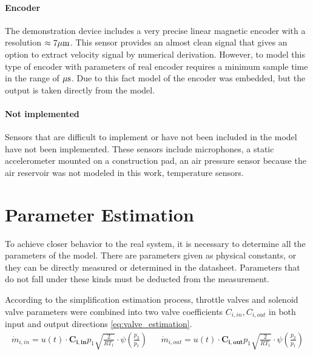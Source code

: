 \paragraph{Encoder}
The demonstration device includes a very precise linear magnetic encoder
with a resolution $\approx 7 \rm \mu m$. This sensor provides an almost
clean signal that gives an option to extract velocity signal by numerical
derivation.  However, to model this type of encoder with parameters of real
encoder requires a minimum sample time in the range of $\rm \mu s$. Due to
this fact model of the encoder was embedded, but the output is taken
directly from the model.

\paragraph{Not implemented}

Sensors that are difficult to implement or have not been included in the
model have not been implemented. These sensors include microphones, a
static accelerometer mounted on a construction pad, an air pressure sensor
because the air reservoir was not modeled in this work, temperature
sensors.

\section{Parameter Estimation}

To achieve closer behavior to the real system, it is necessary to determine
all the parameters of the model.  There are parameters given as physical
constants, or they can be directly measured or determined in the datasheet.
Parameters that do not fall under these kinds must be deducted from the
measurement.

According to the simplification estimation process, throttle valves and
solenoid valve parameters were combined into two valve coefficients
$C_{i,in}, C_{i,out}$ in both input and output directions \ref{eq:valve_estimation}.
\begin{align}
    \dot{m}_{i,in} = u(t)\cdot \boldsymbol{C_{i,in}} p_1 \sqrt{\frac{2}{RT_1}}
    \cdot \psi\left(\frac{p_2}{p_1}\right) &&
    \dot{m}_{i,out} = u(t)\cdot \boldsymbol{C_{i,out}} p_1 \sqrt{\frac{2}{RT_1}}
    \cdot \psi\left(\frac{p_2}{p_1}\right)
    \label{eq:valve_estimation}
\end{align}

